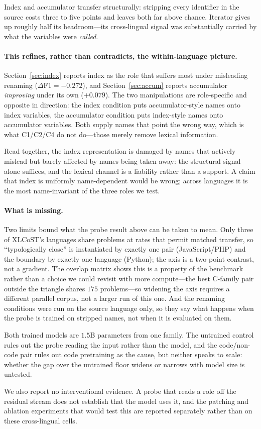 Index and accumulator transfer structurally: stripping every identifier in
the source costs three to five points and leaves both far above chance.
Iterator gives up roughly half its headroom---its cross-lingual signal was
substantially carried by what the variables were \emph{called}.

\paragraph{This refines, rather than contradicts, the within-language
picture.} Section~\ref{sec:index} reports index as the role that suffers most
under misleading renaming ($\Delta\mathrm{F1} = -0.272$), and
Section~\ref{sec:accum} reports accumulator \emph{improving} under its own
($+0.079$). The two manipulations are role-specific and opposite in
direction: the index condition puts accumulator-style names onto index
variables, the accumulator condition puts index-style names onto accumulator
variables. Both supply names that point the wrong way, which is what C1/C2/C4
do not do---those merely remove lexical information.

Read together, the index representation is damaged by names that actively
mislead but barely affected by names being taken away: the structural signal
alone suffices, and the lexical channel is a liability rather than a support.
A claim that index is uniformly name-dependent would be wrong; across
languages it is the most name-invariant of the three roles we test.

\paragraph{What is missing.} Two limits bound what the probe result above
can be taken to mean. Only three of XLCoST's languages share problems at rates that
permit matched transfer, so ``typologically close'' is instantiated by exactly
one pair (JavaScript/PHP) and the boundary by exactly one language (Python);
the axis is a two-point contrast, not a gradient. The overlap matrix shows
this is a property of the benchmark rather than a choice we could revisit with
more compute---the best C-family pair outside the triangle shares $175$
problems---so widening the axis requires a different parallel corpus, not a
larger run of this one. And the renaming conditions
were run on the source language only, so they say what happens when the probe
is trained on stripped names, not when it is evaluated on them.

Both trained models are $1.5$B parameters from one family. The untrained
control rules out the probe reading the input rather than the model, and the
code/non-code pair rules out code pretraining as the cause, but neither speaks
to scale: whether the gap over the untrained floor widens or narrows with model
size is untested.

We also report no interventional evidence. A probe that reads a role off the
residual stream does not establish that the model uses it, and the patching and
ablation experiments that would test this are reported separately rather than
on these cross-lingual cells.
